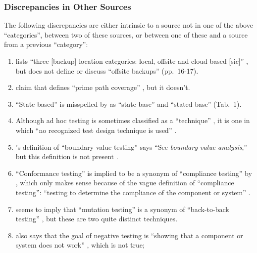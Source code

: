 \subsubsection{Discrepancies in Other Sources}

The following discrepancies are either intrinsic to a source not in one of the
above ``categories'', between two of these sources, or between one of these and
a source from a previous ``category'':

\begin{enumerate}[resume]
      \item \citeauthor{Bas2024} lists ``three [backup] location categories:
            local, offsite and cloud based [sic]'' \citeyearpar[p.~16]{Bas2024},
            but does not define or discuss ``offsite backups'' (pp.~16-17).
      \item \citeauthor{DoğanEtAl2014} claim that \citep{SakamotoEtAl2013}
            defines ``prime path coverage'' \citeyearpar[p.~184]{DoğanEtAl2014},
            but it doesn't.
      \item ``State-based'' is misspelled by \citeauthor{Kam2008} as
            ``state-base'' \citeyearpar[pp.~13,~15]{Kam2008} and
            ``stated-base'' (Tab.~1).
      \item Although ad hoc testing is sometimes classified as a ``technique''
            \citep[p.~5-14]{SWEBOK2024}, it is one in which ``no recognized test
            design technique is used'' \citep[p.~42]{Kam2008}.
      \item \citeauthor{Kam2008}'s definition of ``boundary value testing''
            says ``See \emph{boundary value analysis},'' but this definition is
            not present \citeyearpar{Kam2008}.
      \item ``Conformance testing'' is implied to be a synonym of ``compliance
            testing'' by \citeauthor{Kam2008}, which only makes sense because
            of the vague definition of ``compliance testing'': ``testing to
            determine the compliance of the component or system''
            \citeyearpar[p.~43]{Kam2008}.
      \item \citeauthor{Kam2008} seems to imply that ``mutation testing'' is a
            synonym of ``back-to-back testing'' \citeyearpar[p.~46]{Kam2008},
            but these are two quite distinct techniques.
      \item \citeauthor{Kam2008} also says that the goal of negative testing is
            ``showing that a component or system does not work''
            \citeyearpar[p.~46]{Kam2008} , which is not true;

\end{enumerate}
